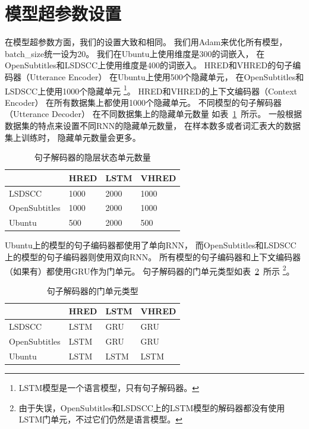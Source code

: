 \section{模型超参数设置}\label{sec:model_hparams}
在模型超参数方面，我们的设置大致和\cite{VHRED}相同。
我们用Adam来优化所有模型，
batch\_size统一设为20。
我们在Ubuntu上使用维度是300的词嵌入，
在OpenSubtitles和LSDSCC上使用维度是400的词嵌入。
HRED和VHRED的句子编码器（Utterance Encoder）
在Ubuntu上使用500个隐藏单元，
在OpenSubtitles和LSDSCC上使用1000个隐藏单元
\footnote{LSTM模型是一个语言模型，只有句子解码器。}。
HRED和VHRED的上下文编码器（Context Encoder）
在所有数据集上都使用1000个隐藏单元。
不同模型的句子解码器（Utterance Decoder）
在不同数据集上的隐藏单元数量
如表~\ref{tab:utterance_decoder_hidden_units}~所示。
一般根据数据集的特点来设置不同RNN的隐藏单元数量，
在样本数多或者词汇表大的数据集上训练时，
隐藏单元数量会更多。

\begin{table}[H]
    \centering
    \caption{句子解码器的隐层状态单元数量}
    \label{tab:utterance_decoder_hidden_units}
    \begin{tabular}{llll}
        \toprule
        & HRED & LSTM & VHRED \\
        \midrule
        LSDSCC & 1000 & 2000 & 1000 \\
        OpenSubtitles & 1000 & 2000 & 1000 \\
        Ubuntu & 500 & 2000 & 500 \\
        \bottomrule
    \end{tabular}
\end{table}

Ubuntu上的模型的句子编码器都使用了单向RNN，
而OpenSubtitles和LSDSCC上的模型的句子编码器则使用双向RNN。
所有模型的句子编码器和上下文编码器（如果有）都使用GRU作为门单元。
句子解码器的门单元类型如表~\ref{tab:utterance_decoder_gate_types}~所示
\footnote{由于失误，OpenSubtitles和LSDSCC上的LSTM模型的解码器都没有使用LSTM门单元，不过它们仍然是语言模型。}。
\begin{table}[H]
    \centering
    \caption{句子解码器的门单元类型}
    \label{tab:utterance_decoder_gate_types}
    \begin{tabular}{llll}
        \toprule
        & HRED & LSTM & VHRED \\
        \midrule
        LSDSCC & LSTM & GRU & GRU \\
        OpenSubtitles & LSTM & GRU & GRU \\
        Ubuntu & LSTM & LSTM & LSTM \\
        \bottomrule
    \end{tabular}
\end{table}

